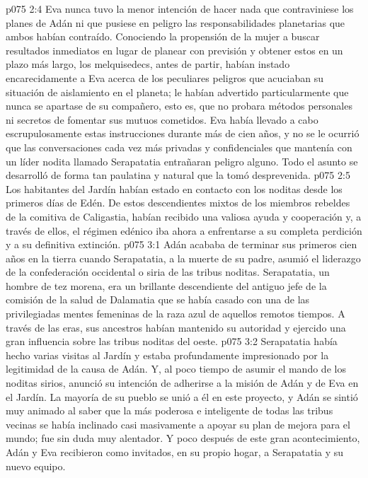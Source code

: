 \vs p075 2:4 \pc Eva nunca tuvo la menor intención de hacer nada que contraviniese los planes de Adán ni que pusiese en peligro las responsabilidades planetarias que ambos habían contraído. Conociendo la propensión de la mujer a buscar resultados inmediatos en lugar de planear con previsión y obtener estos en un plazo más largo, los melquisedecs, antes de partir, habían instado encarecidamente a Eva acerca de los peculiares peligros que acuciaban su situación de aislamiento en el planeta; le habían advertido particularmente que nunca se apartase de su compañero, esto es, que no probara métodos personales ni secretos de fomentar sus mutuos cometidos. Eva había llevado a cabo escrupulosamente estas instrucciones durante más de cien años, y no se le ocurrió que las conversaciones cada vez más privadas y confidenciales que mantenía con un líder nodita llamado Serapatatia entrañaran peligro alguno. Todo el asunto se desarrolló de forma tan paulatina y natural que la tomó desprevenida.
\vs p075 2:5 Los habitantes del Jardín habían estado en contacto con los noditas desde los primeros días de Edén. De estos descendientes mixtos de los miembros rebeldes de la comitiva de Caligastia, habían recibido una valiosa ayuda y cooperación y, a través de ellos, el régimen edénico iba ahora a enfrentarse a su completa perdición y a su definitiva extinción.
\vs p075 3:1 Adán acababa de terminar sus primeros cien años en la tierra cuando Serapatatia, a la muerte de su padre, asumió el liderazgo de la confederación occidental o siria de las tribus noditas. Serapatatia, un hombre de tez morena, era un brillante descendiente del antiguo jefe de la comisión de la salud de Dalamatia que se había casado con una de las privilegiadas mentes femeninas de la raza azul de aquellos remotos tiempos. A través de las eras, sus ancestros habían mantenido su autoridad y ejercido una gran influencia sobre las tribus noditas del oeste.
\vs p075 3:2 Serapatatia había hecho varias visitas al Jardín y estaba profundamente impresionado por la legitimidad de la causa de Adán. Y, al poco tiempo de asumir el mando de los noditas sirios, anunció su intención de adherirse a la misión de Adán y de Eva en el Jardín. La mayoría de su pueblo se unió a él en este proyecto, y Adán se sintió muy animado al saber que la más poderosa e inteligente de todas las tribus vecinas se había inclinado casi masivamente a apoyar su plan de mejora para el mundo; fue sin duda muy alentador. Y poco después de este gran acontecimiento, Adán y Eva recibieron como invitados, en su propio hogar, a Serapatatia y su nuevo equipo.
